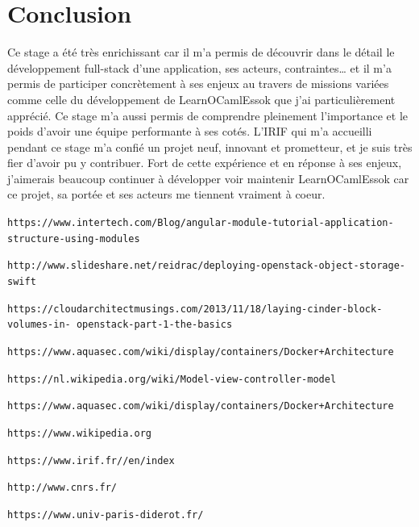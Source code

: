 \documentclass{article}
\begin{document}
\newpage

\section{Conclusion}

Ce stage a été très enrichissant car il m’a permis de découvrir dans le détail le développement full-stack d'une application, ses acteurs, contraintes… et il m’a permis de participer concrètement à ses enjeux au travers de missions variées comme celle du développement de LearnOCamlEssok que j’ai particulièrement apprécié. Ce stage m’a aussi permis de comprendre pleinement l'importance et le poids d'avoir une équipe performante à ses cotés.
\newline
L'IRIF qui m’a accueilli pendant ce stage m'a confié un projet neuf, innovant et prometteur, et je suis très fier d’avoir pu y contribuer.
\newline
\newline
Fort de cette expérience et en réponse à ses enjeux, j’aimerais beaucoup continuer à développer voir maintenir LearnOCamlEssok car ce projet, sa portée et ses acteurs me tiennent vraiment à coeur.
\newpage

\begin{thebibliography}{9}

	\texttt{https://www.intertech.com/Blog/angular-module-tutorial-application-structure-using-modules}

	\texttt{http://www.slideshare.net/reidrac/deploying-openstack-object-storage-swift}

	\texttt{https://cloudarchitectmusings.com/2013/11/18/laying-cinder-block-volumes-in-
			openstack-part-1-the-basics}

    \texttt{https://www.aquasec.com/wiki/display/containers/Docker+Architecture}

    \texttt{https://nl.wikipedia.org/wiki/Model-view-controller-model}

    \texttt{https://www.aquasec.com/wiki/display/containers/Docker+Architecture}

	\texttt{https://www.wikipedia.org}

	\texttt{https://www.irif.fr//en/index}

	\texttt{http://www.cnrs.fr/}

	\texttt{https://www.univ-paris-diderot.fr/}
	\end{thebibliography}
\end{document}
